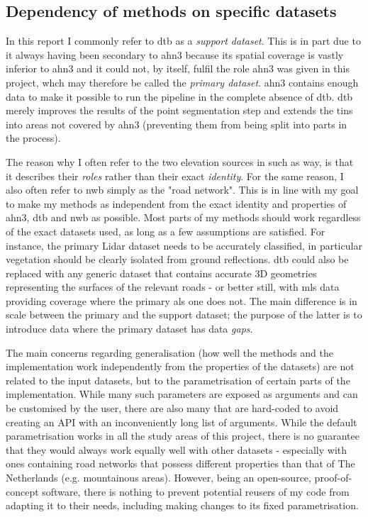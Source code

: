 \subsection{Dependency of methods on specific datasets}
\label{sub:m_generalisation}

In this report I commonly refer to \ac{dtb} as a \textit{support dataset}. This is in part due to it always having been secondary to \ac{ahn3} because its spatial coverage is vastly inferior to \ac{ahn3} and it could not, by itself, fulfil the role \ac{ahn3} was given in this project, whch may therefore be called the \textit{primary dataset}. \ac{ahn3} contains enough data to make it possible to run the pipeline in the complete absence of \ac{dtb}. \ac{dtb} merely improves the results of the point segmentation step and extends the \ac{tin}s into areas not covered by \ac{ahn3} (preventing them from being split into parts in the process).

The reason why I often refer to the two elevation sources in such as way, is that it describes their \textit{roles} rather than their exact \textit{identity}. For the same reason, I also often refer to \ac{nwb} simply as the "road network". This is in line with my goal to make my methods as independent from the exact identity and properties of \ac{ahn3}, \ac{dtb} and \ac{nwb} as possible. Most parts of my methods should work regardless of the exact datasets used, as long as a few assumptions are satisfied. For instance, the primary Lidar dataset needs to be accurately classified, in particular vegetation should be clearly isolated from ground reflections. \ac{dtb} could also be replaced with any generic dataset that contains accurate 3D geometries representing the surfaces of the relevant roads - or better still, with \ac{mls} data providing coverage where the primary \ac{als} one does not. The main difference is in scale between the primary and the support dataset; the purpose of the latter is to introduce data where the primary dataset has data \textit{gaps}.

The main concerns regarding generalisation (how well the methods and the implementation work independently from the properties of the datasets) are not related to the input datasets, but to the parametrisation of certain parts of the implementation. While many such parameters are exposed as arguments and can be customised by the user, there are also many that are hard-coded to avoid creating an API with an inconveniently long list of arguments. While the default parametrisation works in all the study areas of this project, there is no guarantee that they would always work equally well with other datasets - especially with ones containing road networks that possess different properties than that of The Netherlands (e.g. mountainous areas). However, being an open-source, proof-of-concept software, there is nothing to prevent potential reusers of my code from adapting it to their needs, including making changes to its fixed parametrisation.

